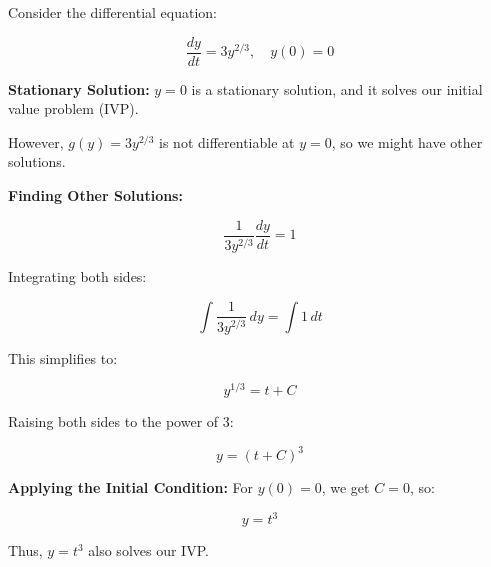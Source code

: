 \documentclass{article}
\begin{document}
Consider the differential equation:

\[
\frac{dy}{dt} = 3y^{2/3}, \quad y(0) = 0
\]

\textbf{Stationary Solution:}  
\( y = 0 \) is a stationary solution, and it solves our initial value problem (IVP).

However, \( g(y) = 3y^{2/3} \) is not differentiable at \( y = 0 \), so we might have other solutions.

\textbf{Finding Other Solutions:}

\[
\frac{1}{3y^{2/3}} \frac{dy}{dt} = 1
\]

Integrating both sides:

\[
\int \frac{1}{3y^{2/3}} \, dy = \int 1 \, dt
\]

This simplifies to:

\[
y^{1/3} = t + C
\]

Raising both sides to the power of 3:

\[
y = (t + C)^3
\]

\textbf{Applying the Initial Condition:}  
For \( y(0) = 0 \), we get \( C = 0 \), so:

\[
y = t^3
\]

Thus, \( y = t^3 \) also solves our IVP.
\end{document}

